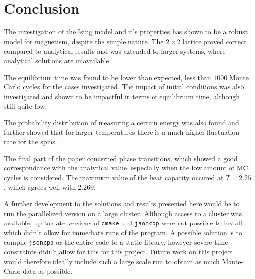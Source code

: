 \documentclass[aps,reprint]{revtex4-1}
\newcommand\blankpage{%
  \null
  \thispagestyle{empty}%
  \addtocounter{page}{-1}%
  \newpage}
\begin{document}
\section{Conclusion} \label{sec:conclusion}
The investigation of the Ising model and it's properties has shown to be a robust
model for magnetism, despite the simple nature. The $2 \times 2$ lattice
proved correct compared to analytical results and was extended to larger systems,
where analytical solutions are unavailable.

The equilibrium time was found to be lower than expected, less than $1000$ Monte Carlo cycles for the cases investigated.
The impact of initial conditions was also investigated and shown to be impactful
in terms of equilibrium time, although still quite low.

The probability distribution
of measuring a certain energy was also found and further showed that for larger
temperatures there is a much higher fluctuation rate for the spins.

The final part of the paper concerned phase transitions, which showed a good
correspondance with the analytical value, especially when the low amount of MC cycles
is considered. The maximum value of the heat capacity occured at $T = 2.25$, which
agrees well with $2.269$.

A further development to the solutions and results presented here would be to
run the parallelized version on a large cluster. Although access to a cluster
was available, up to date versions of \texttt{cmake} and \texttt{jsoncpp} were not possible to install
which didn't allow for immediate runs of the program. A possible solution is to
compile \texttt{jsoncpp} or the entire code to a static library, however severe
time constraints didn't allow for this for this project. Future work on this
project would therefore ideally include such a large scale run to obtain as much
Monte-Carlo data as possible.

\blankpage
\end{document}
